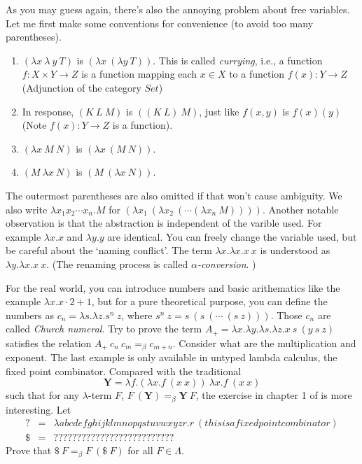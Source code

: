 As you may guess again, there's also the annoying problem about free
variables. Let me first make some conventions for convenience (to
avoid too many parentheses). 
\begin{enumerate}
    \item $(\lambda x\ \lambda\ y\ T)$ is $(\lambda x\ (\lambda y\ T))$.
    This is called {\it currying}, i.e., a function $f: X\times Y\to Z$ is
    a function mapping each $x\in X$ to a function $f(x): Y\to Z$ 
    (Adjunction of the category $Set$)
    \item In response, $(K\ L\ M)$ is $((K\ L)\ M)$, just like $f(x, y)$
    is $f(x)(y)$ (Note $f(x): Y\to Z$ is a function). 
    \item $(\lambda x\ M\ N)$ is $(\lambda x\ (M\ N))$.
    \item $(M\ \lambda x\ N)$ is $(M\ (\lambda x\ N))$.
\end{enumerate}

The outermost parentheses are also omitted if that won't cause ambiguity.
We also write $\lambda x_1 x_2\cdots x_n.M$ for 
$(\lambda x_1\ (\lambda x_2\ (\cdots(\lambda x_n\ M))))$. Another notable
observation is that the abstraction is independent of the varible used.
For example $\lambda x.x$ and $\lambda y.y$ are identical. You can freely
change the variable used, but be careful about the `naming conflict'. 
The term $\lambda x. \lambda x. x\ x$ is understood as 
$\lambda y. \lambda x. x\ x$. (The renaming process is called {\it
$\alpha$-conversion}. )

For the real world, you can introduce numbers and basic arithematics like
the example $\lambda x. x \cdot 2 + 1$, but for a pure theoretical 
purpose, you can define the numbers as $c_n=\lambda s.\lambda z. s^n\ z$, 
where $s^n\ z = s\ (s\ (\cdots\ (s\ z)))$. Those $c_n$ are called {\it
Church numeral}. Try to prove the term $A_+=\lambda x.\lambda y.\lambda s
.\lambda z.x\ s\ (y\ s\ z)$ satisfies the relation 
$A_+\ c_n\ c_m=_\beta c_{m+n}$. Consider what are the multiplication and 
exponent. The last example is only available in untyped lambda calculus,
the fixed point combinator. Compared with the traditional 
\newcommand{\Ycomb}{\mathbf{Y}}
$$\Ycomb = \lambda f.(\lambda x.f\ (x\ x))\ \lambda x.f\ (x\ x)$$
such that for any $\lambda$-term $F$, 
$F\ (\Ycomb)=_\beta \Ycomb\ F$, the exercise in chapter 1 of 
\cite{Curry-Howard} is more interesting. Let
$$
\begin{array}{lll}
    ? &=& \lambda abcdefghijklmnopqstuvwxyzr.r\ (thisisafixedpointcombinator) \\
    \$ &=& ??????????????????????????
\end{array}
$$
Prove that $\$\ F=_\beta F\ (\$\ F)$ for all $F\in\Lambda$.

